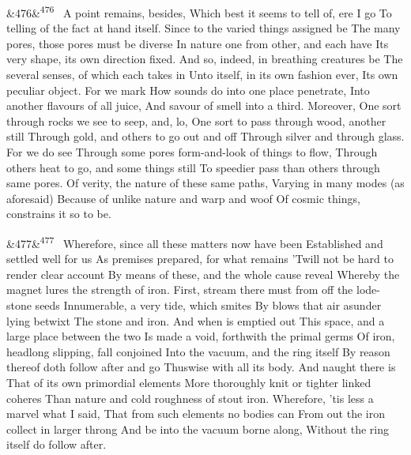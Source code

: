 \documentclass[12pt]{article}
\newcommand{\para}[1][]{\par\noindent\ifx&#1&\else\textsuperscript{\footnotesize #1}~\fi}
\begin{document}
\para[476] A point remains, besides, Which best it seems to tell of, ere I go To telling of the fact at hand itself. Since to the varied things assigned be The many pores, those pores must be diverse In nature one from other, and each have Its very shape, its own direction fixed. And so, indeed, in breathing creatures be The several senses, of which each takes in Unto itself, in its own fashion ever, Its own peculiar object. For we mark How sounds do into one place penetrate, Into another flavours of all juice, And savour of smell into a third. Moreover, One sort through rocks we see to seep, and, lo, One sort to pass through wood, another still Through gold, and others to go out and off Through silver and through glass. For we do see Through some pores form-and-look of things to flow, Through others heat to go, and some things still To speedier pass than others through same pores. Of verity, the nature of these same paths, Varying in many modes (as aforesaid) Because of unlike nature and warp and woof Of cosmic things, constrains it so to be.

\para[477] Wherefore, since all these matters now have been Established and settled well for us As premises prepared, for what remains 'Twill not be hard to render clear account By means of these, and the whole cause reveal Whereby the magnet lures the strength of iron. First, stream there must from off the lode-stone seeds Innumerable, a very tide, which smites By blows that air asunder lying betwixt The stone and iron. And when is emptied out This space, and a large place between the two Is made a void, forthwith the primal germs Of iron, headlong slipping, fall conjoined Into the vacuum, and the ring itself By reason thereof doth follow after and go Thuswise with all its body. And naught there is That of its own primordial elements More thoroughly knit or tighter linked coheres Than nature and cold roughness of stout iron. Wherefore, 'tis less a marvel what I said, That from such elements no bodies can From out the iron collect in larger throng And be into the vacuum borne along, Without the ring itself do follow after.
\end{document}
